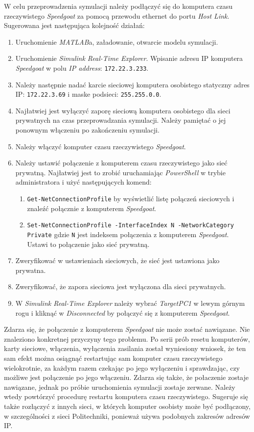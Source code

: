 W celu przeprowadzenia symulacji należy podłączyć się do komputera czasu rzeczywistego \textit{Speedgoat} za pomocą 
przewodu ethernet do portu \textit{Host Link}. Sugerowana jest następująca kolejność działań:
\begin{enumerate}
    \item Uruchomienie \textit{MATLAB}a, załadowanie, otwarcie modelu symulacji.
    \item Uruchomienie \textit{Simulink Real-Time Explorer}. Wpisanie adresu IP komputera \textit{Speedgoat} w polu \textit{IP address}: \texttt{172.22.3.233}.
    \item Należy następnie nadać karcie sieciowej komputera osobistego statyczny adres IP: \texttt{172.22.3.69} i maske podsieci: \texttt{255.255.0.0}.
    \item Najłatwiej jest wyłączyć zaporę sieciową komputera osobistego dla sieci prywatnych na czas przeprowadzania symulacji. Należy pamiętać o jej ponownym włączeniu po zakończeniu symulacji.
    \item Należy włączyć komputer czasu rzeczywistego \textit{Speedgoat}.
    \item Należy ustawić połączenie z komputerem czasu rzeczywistego jako sieć prywatną. Najłatwiej jest to zrobić uruchamiając \textit{PowerShell} w trybie administratora i użyć następujących komend: 
    \begin{enumerate}
        \item \texttt{Get-NetConnectionProfile} by wyświetlić listę połączeń sieciowych i znaleźć połącznie z komputerem \textit{Speedgoat}.
        \item \texttt{Set-NetConnectionProfile -InterfaceIndex N -NetworkCategory Private} gdzie \texttt{N} jest indeksem połączenia z komputerem \textit{Speedgoat}. Ustawi to połączenie jako sieć prywatną.
    \end{enumerate} 
    \item Zweryfikować w ustawieniach sieciowych, że sieć jest ustawiona jako prywatna.
    \item Zweryfikować, że zapora sieciowa jest wyłączona dla sieci prywatnych.
    \item W \textit{Simulink Real-Time Explorer} należy wybrać \textit{TargetPC1} w lewym górnym rogu i kliknąć w \textit{Disconnected} by połączyć się z komputerem \textit{Speedgoat}.
\end{enumerate}

Zdarza się, że połączenie z komputerem \textit{Speedgoat} nie może zostać nawiązane. Nie znaleziono konkretnej przyczyny tego problemu.
Po serii prób resetu komputerów, karty sieciowe, włączenia, wyłączenia zasilania został wyniesiony wniosek, że ten sam efekt 
można osiągnąć restartując sam komputer czasu rzeczywistego wielokrotnie, za każdym razem czekając po jego wyłączeniu i sprawdzając,
czy możliwe jest połączenie po jego włączeniu. Zdarza się także, że połaczenie zostaje nawiązane, jednak po próbie uruchomienia symulacji zostaje zerwane.
Należy wtedy powtórzyć procedurę restartu komputera czasu rzeczywistego. 
Sugeruje się także rozłączyć z innych sieci, w których komputer osobisty może być podłączony,
w szczególności z sieci Politechniki, ponieważ używa podobnych zakresów adresów IP.

